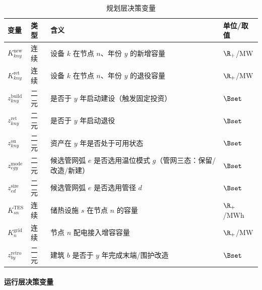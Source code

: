 \begin{table}[H]
  \centering
  \caption{规划层决策变量}
  \label{tab:plan-vars}
  \small
  \begin{tabularx}{\textwidth}{llXl}
    \toprule
    变量 & 类型 & 含义 & 单位/取值 \\
    \midrule
    $K^{\mathrm{new}}_{kny}$ & 连续 & 设备 $k$ 在节点 $n$、年份 $y$ 的新增容量 & $\R_+$/MW \\
    $K^{\mathrm{ret}}_{kny}$ & 连续 & 设备 $k$ 在节点 $n$、年份 $y$ 的退役容量 & $\R_+$/MW \\
    $z^{\mathrm{build}}_{kny}$ & 二元 & 是否于 $y$ 年启动建设（触发固定投资） & $\Bset$ \\
    $z^{\mathrm{ret}}_{kny}$ & 二元 & 是否于 $y$ 年启动退役 & $\Bset$ \\
    $z^{\mathrm{on}}_{kny}$ & 二元 & 资产在 $y$ 年是否处于可用状态 & $\Bset$ \\
    $z^{\mathrm{mode}}_{egy}$ & 二元 & 候选管网弧 $e$ 是否选用温位模式 $g$（管网三态：保留/改造/新建） & $\Bset$ \\
    $z^{\mathrm{size}}_{ed}$ & 二元 & 候选管网弧 $e$ 是否选用管径 $d$ & $\Bset$ \\
    $K^{\mathrm{TES}}_{sn}$ & 连续 & 储热设施 $s$ 在节点 $n$ 的容量 & $\R_+$/MWh \\
    $K^{\mathrm{grid}}_{n}$ & 连续 & 节点 $n$ 配电接入增容容量 & $\R_+$/MW \\
    $z^{\mathrm{retro}}_{by}$ & 二元 & 建筑 $b$ 是否于 $y$ 年完成末端/围护改造 & $\Bset$ \\
    \bottomrule
  \end{tabularx}
\end{table}

\paragraph{运行层决策变量}

